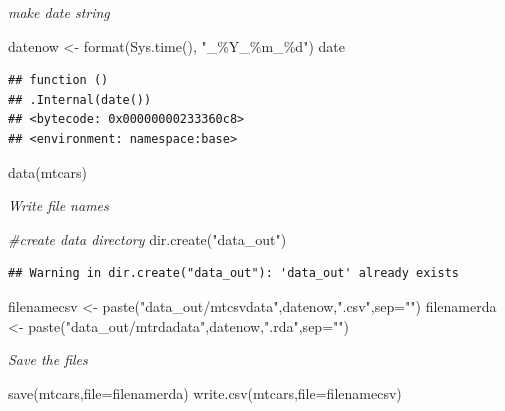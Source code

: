 \documentclass[
]{book}
\newenvironment{Shaded}{\begin{snugshade}}{\end{snugshade}}
\newcommand{\AttributeTok}[1]{\textcolor[rgb]{0.77,0.63,0.00}{#1}}
\newcommand{\CommentTok}[1]{\textcolor[rgb]{0.56,0.35,0.01}{\textit{#1}}}
\newcommand{\FunctionTok}[1]{\textcolor[rgb]{0.00,0.00,0.00}{#1}}
\newcommand{\NormalTok}[1]{#1}
\newcommand{\OtherTok}[1]{\textcolor[rgb]{0.56,0.35,0.01}{#1}}
\newcommand{\StringTok}[1]{\textcolor[rgb]{0.31,0.60,0.02}{#1}}
\begin{document}
\emph{make date string}

\begin{Shaded}
\begin{Highlighting}[]
\NormalTok{datenow }\OtherTok{\textless{}{-}} \FunctionTok{format}\NormalTok{(}\FunctionTok{Sys.time}\NormalTok{(), }\StringTok{"\_\%Y\_\%m\_\%d"}\NormalTok{)}
\NormalTok{date}
\end{Highlighting}
\end{Shaded}

\begin{verbatim}
## function () 
## .Internal(date())
## <bytecode: 0x00000000233360c8>
## <environment: namespace:base>
\end{verbatim}

\begin{Shaded}
\begin{Highlighting}[]
\FunctionTok{data}\NormalTok{(mtcars)}
\end{Highlighting}
\end{Shaded}

\emph{Write file names}

\begin{Shaded}
\begin{Highlighting}[]
\CommentTok{\#create data directory}
\FunctionTok{dir.create}\NormalTok{(}\StringTok{"data\_out"}\NormalTok{)}
\end{Highlighting}
\end{Shaded}

\begin{verbatim}
## Warning in dir.create("data_out"): 'data_out' already exists
\end{verbatim}

\begin{Shaded}
\begin{Highlighting}[]
\NormalTok{filenamecsv }\OtherTok{\textless{}{-}} \FunctionTok{paste}\NormalTok{(}\StringTok{"data\_out/mtcsvdata"}\NormalTok{,datenow,}\StringTok{".csv"}\NormalTok{,}\AttributeTok{sep=}\StringTok{""}\NormalTok{)}
\NormalTok{filenamerda }\OtherTok{\textless{}{-}} \FunctionTok{paste}\NormalTok{(}\StringTok{"data\_out/mtrdadata"}\NormalTok{,datenow,}\StringTok{".rda"}\NormalTok{,}\AttributeTok{sep=}\StringTok{""}\NormalTok{)}
\end{Highlighting}
\end{Shaded}

\emph{Save the files}

\begin{Shaded}
\begin{Highlighting}[]
\FunctionTok{save}\NormalTok{(mtcars,}\AttributeTok{file=}\NormalTok{filenamerda)}
\FunctionTok{write.csv}\NormalTok{(mtcars,}\AttributeTok{file=}\NormalTok{filenamecsv)}
\end{Highlighting}
\end{Shaded}
\end{document}
